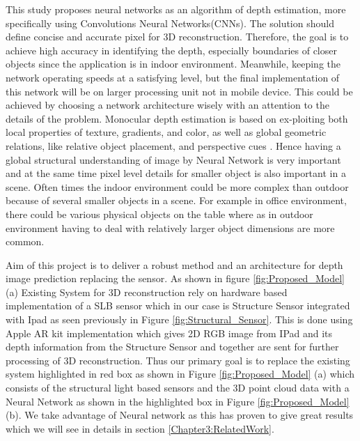 This study proposes neural networks as an algorithm of depth estimation, more specifically using Convolutions Neural Networks(CNNs). The solution should define concise and accurate pixel for 3D reconstruction. Therefore, the goal is to achieve high accuracy in identifying the depth, especially boundaries of closer objects since the application is in indoor environment. Meanwhile, keeping the network operating speeds at a satisfying level, but the final implementation of this network will be on larger processing unit not in mobile device. This could be achieved by choosing a network architecture wisely with an attention to the details of the problem. Monocular depth estimation is based on ex-ploiting both local properties of texture, gradients, and color, as well as global geometric relations, like relative object placement, and perspective cues \cite{saxena2006learning}. Hence having a global structural understanding of image by Neural Network is very important and at the same time pixel level details for smaller object is also important in a scene. Often times the indoor environment could be more complex than outdoor because of several smaller objects in a scene. For example in office environment, there could be various physical objects on the table where as in outdoor environment having to deal with relatively larger object dimensions are more common.  

Aim of this project is to deliver a robust method and an architecture for depth image prediction replacing the sensor. As shown in figure \ref{fig:Proposed_Model} (a) Existing System for 3D reconstruction rely on hardware based implementation of a SLB sensor which in our case is Structure Sensor integrated with Ipad as seen previously in Figure \ref{fig:Structural_Sensor}. This is done using Apple AR kit implementation which gives 2D RGB image from IPad and its depth information from the Structure Sensor and together are sent for further processing of 3D reconstruction. Thus our primary goal is to replace the existing system highlighted in red box as shown in Figure \ref{fig:Proposed_Model} (a) which consists of the structural light based sensors and the 3D point cloud data with a Neural Network as shown in the highlighted box in Figure \ref{fig:Proposed_Model}(b). We take advantage of Neural network as this has proven to give great results which we will see in details in section \ref{Chapter3:RelatedWork}.


